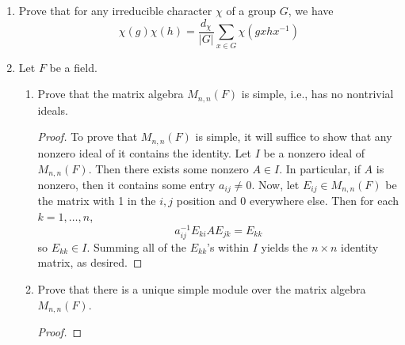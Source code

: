 \documentclass[../psets.tex]{subfiles}
\begin{document}
\begin{enumerate}
    \item Prove that for any irreducible character $\chi$ of a group $G$, we have
    \begin{equation*}
        \chi(g)\chi(h) = \frac{d_\chi}{|G|}\sum_{x\in G}\chi(gxhx^{-1})
    \end{equation*}
    \item Let $F$ be a field.
    \begin{enumerate}
        \item Prove that the matrix algebra $M_{n,n}(F)$ is simple, i.e., has no nontrivial ideals.
        \begin{proof}
            To prove that $M_{n,n}(F)$ is simple, it will suffice to show that any nonzero ideal of it contains the identity. Let $I$ be a nonzero ideal of $M_{n,n}(F)$. Then there exists some nonzero $A\in I$. In particular, if $A$ is nonzero, then it contains some entry $a_{ij}\neq 0$. Now, let $E_{ij}\in M_{n,n}(F)$ be the matrix with 1 in the $i,j$ position and 0 everywhere else. Then for each $k=1,\dots,n$,
            \begin{equation*}
                a_{ij}^{-1}E_{ki}AE_{jk} = E_{kk}
            \end{equation*}
            so $E_{kk}\in I$. Summing all of the $E_{kk}$'s within $I$ yields the $n\times n$ identity matrix, as desired.
        \end{proof}
        \item Prove that there is a unique simple module over the matrix algebra $M_{n,n}(F)$.
        \begin{proof}

\end{proof}
\end{enumerate}
\end{enumerate}
\end{document}

